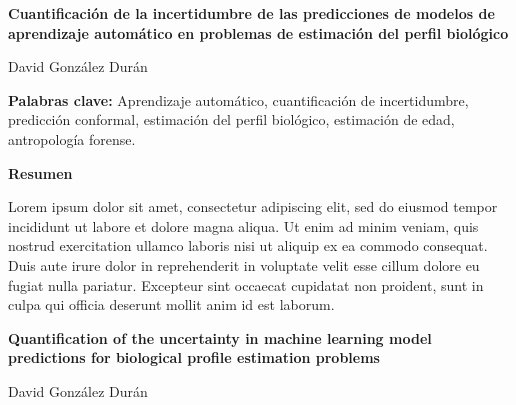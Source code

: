 

%

\cleardoublepage
\thispagestyle{empty}

\begin{center}
    {\large\bfseries Cuantificación de la incertidumbre de las predicciones de modelos de aprendizaje automático en problemas de estimación del perfil biológico}
\end{center}
\begin{center}
    David González Durán
\end{center}

\vspace{0.7cm}

\noindent\textbf{Palabras clave:} Aprendizaje automático, cuantificación de incertidumbre, predicción conformal, estimación del perfil biológico, estimación de edad, antropología forense.

\vspace{0.7cm}

\noindent\textbf{Resumen}

Lorem ipsum dolor sit amet, consectetur adipiscing elit, sed do eiusmod tempor incididunt ut labore et dolore magna aliqua. Ut enim ad minim veniam, quis nostrud exercitation ullamco laboris nisi ut aliquip ex ea commodo consequat. Duis aute irure dolor in reprehenderit in voluptate velit esse cillum dolore eu fugiat nulla pariatur. Excepteur sint occaecat cupidatat non proident, sunt in culpa qui officia deserunt mollit anim id est laborum.


\cleardoublepage
\thispagestyle{empty}

\begin{center}
    {\large\bfseries Quantification of the uncertainty in machine learning model predictions for biological profile estimation problems}
\end{center}
\begin{center}
    David González Durán 
\end{center}

